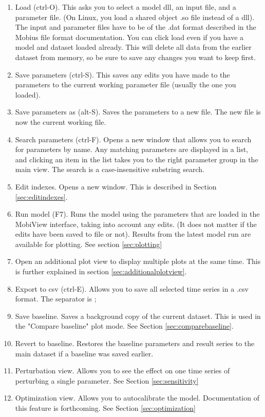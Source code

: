 \documentclass[11pt]{article}
\theoremstyle{definition}
\begin{document}
\begin{enumerate}
\item Load (ctrl-O). This asks you to select a model dll, an input file, and a parameter file. (On Linux, you load a shared object .so file instead of a dll). The input and parameter files have to be of the .dat format described in the Mobius file format documentation. You can click load even if you have a model and dataset loaded already. This will delete all data from the earlier dataset from memory, so be sure to save any changes you want to keep first.
\item Save parameters (ctrl-S). This saves any edits you have made to the parameters to the current working parameter file (usually the one you loaded).
\item Save parameters as (alt-S). Saves the parameters to a new file. The new file is now the current working file.
\item Search parameters (ctrl-F). Opens a new window that allows you to search for parameters by name. Any matching parameters are displayed in a list, and clicking an item in the list takes you to the right parameter group in the main view. The search is a case-insensitive substring search.
\item Edit indexes. Opens a new window. This is described in Section \ref{sec:editindexes}.

\item Run model (F7). Runs the model using the parameters that are loaded in the MobiView interface, taking into account any edits. (It does not matter if the edits have been saved to file or not). Results from the latest model run are available for plotting. See section \ref{sec:plotting}
\item Open an additional plot view to display multiple plots at the same time. This is further explained in section \ref{sec:additionalplotview}.
\item Export to csv (ctrl-E). Allows you to save all selected time series in a .csv format. The separator is ;

\item Save baseline. Saves a background copy of the current dataset. This is used in the "Compare baseline" plot mode. See Section \ref{sec:comparebaseline}.
\item Revert to baseline. Restores the baseline parameters and result series to the main dataset if a baseline was saved earlier.
\item Perturbation view. Allows you to see the effect on one time series of perturbing a single parameter. See Section \ref{sec:sensitivity}
\item Optimization view. Allows you to autocalibrate the model. Documentation of this feature is forthcoming. See Section \ref{sec:optimization}


\end{enumerate}
\end{document}

